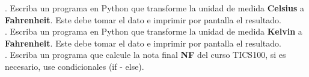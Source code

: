 \documentclass{article}
\begin{document}
. Escriba un programa en Python que transforme la unidad de medida \textbf{Celsius} a \textbf{Fahrenheit}. Este debe tomar el dato e imprimir por pantalla el resultado.\\

. Escriba un programa en Python que transforme la unidad de medida \textbf{Kelvin} a \textbf{Fahrenheit}. Este debe tomar el dato e imprimir por pantalla el resultado.\\

. Escriba un programa que calcule la nota final \textbf{NF} del curso TICS100, si es necesario, use condicionales (if - else).  \\
\end{document}
